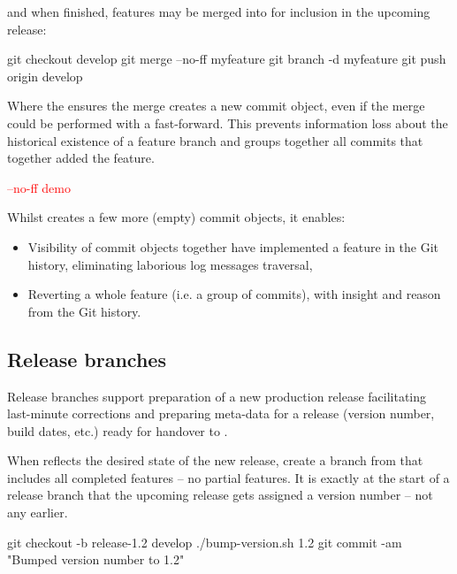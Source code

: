 \noindent and when finished, features may be merged into  for inclusion in the upcoming release:

\begin{git-bash}
    git checkout develop
    git merge --no-ff myfeature
    git branch -d myfeature
    git push origin develop
\end{git-bash}

Where the  ensures the merge creates a new commit object, even if the merge could be performed with a fast-forward. This prevents information loss about the historical existence of a feature branch and groups together all commits that together added the feature.

\begin{center}
	\textcolor{red}{\ttfamily --no-ff demo}
\end{center}

\noindent Whilst  creates a few more (empty) commit objects, it enables:

\begin{itemize}
	\item Visibility of commit objects together have implemented a feature in the Git history, eliminating laborious log messages traversal,
	\item Reverting a whole feature (i.e. a group of commits), with insight and reason from the Git history.
\end{itemize}



\subsection{Release branches}

Release branches support preparation of a new production release facilitating last-minute corrections and preparing meta-data for a release (version number, build dates, etc.) ready for handover to .

When  reflects the desired state of the new release, create a  branch from  that includes all completed features – no partial features. It is exactly at the start of a release branch that the upcoming release gets assigned a version number -- not any earlier. 

\begin{git-bash}
    git checkout -b release-1.2 develop
    ./bump-version.sh 1.2
    git commit -am "Bumped version number to 1.2"
\end{git-bash}

